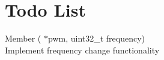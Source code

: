 \chapter{Todo List }
\hypertarget{todo}{}\label{todo}

\begin{DoxyRefList}
\item[Member \doxylink{pwm_8c_a6c16bb2afdf33e25b1419b8b670cd14e}{hal\+\_\+pwm\+\_\+set\+\_\+frequency} (\doxylink{struct_p_w_m___handle}{PWM\+\_\+\+Handle} \texorpdfstring{$\ast$}{*}pwm, uint32\+\_\+t frequency)]\hfill \\
\label{todo__todo000001}%
%
Implement frequency change functionality 
\end{DoxyRefList}